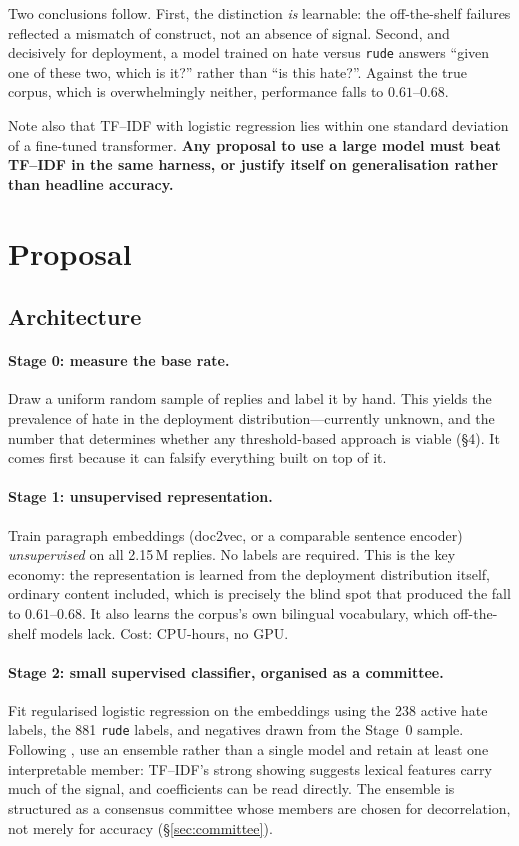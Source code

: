 \documentclass[11pt,a4paper]{article}
\begin{document}
Two conclusions follow. First, the distinction \emph{is} learnable: the off-the-shelf
failures reflected a mismatch of construct, not an absence of signal. Second, and
decisively for deployment, a model trained on hate versus \texttt{rude} answers
``given one of these two, which is it?'' rather than ``is this hate?''. Against the
true corpus, which is overwhelmingly neither, performance falls to $0.61$--$0.68$.

Note also that TF--IDF with logistic regression lies within one standard deviation of
a fine-tuned transformer. \textbf{Any proposal to use a large model must beat
TF--IDF in the same harness, or justify itself on generalisation rather than
headline accuracy.}

\section{Proposal}
\label{sec:proposal}

\subsection{Architecture}

\paragraph{Stage 0: measure the base rate.} Draw a uniform random sample of replies
and label it by hand. This yields the prevalence of hate in the deployment
distribution---currently unknown, and the number that determines whether any
threshold-based approach is viable (\S4). It comes first because it can falsify
everything built on top of it.

\paragraph{Stage 1: unsupervised representation.} Train paragraph embeddings
(doc2vec, or a comparable sentence encoder) \emph{unsupervised} on all 2.15\,M
replies. No labels are required. This is the key economy: the representation is
learned from the deployment distribution itself, ordinary content included, which is
precisely the blind spot that produced the fall to $0.61$--$0.68$. It also learns
the corpus's own bilingual vocabulary, which off-the-shelf models lack. Cost:
CPU-hours, no GPU.

\paragraph{Stage 2: small supervised classifier, organised as a committee.} Fit
regularised logistic regression on the embeddings using the 238 active hate labels,
the 881 \texttt{rude} labels, and negatives drawn from the Stage~0 sample. Following
\cite{garland2020countering}, use an ensemble rather than a single model and retain
at least one interpretable member: TF--IDF's strong showing suggests lexical
features carry much of the signal, and coefficients can be read directly. The
ensemble is structured as a consensus committee whose members are chosen for
decorrelation, not merely for accuracy (\S\ref{sec:committee}).
\end{document}
